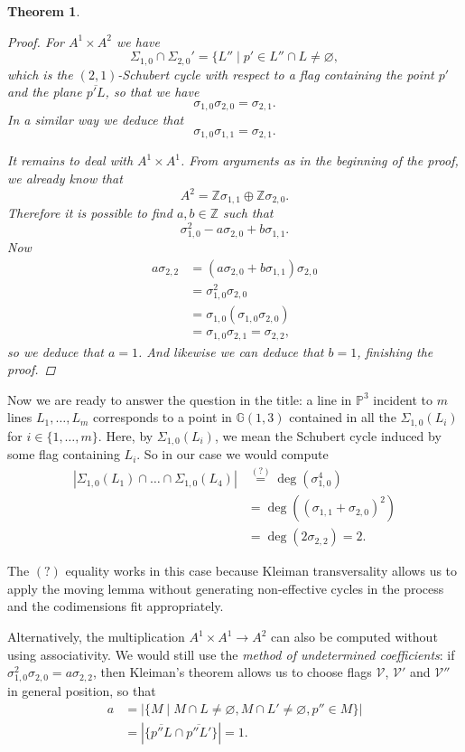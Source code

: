 \documentclass[12pt,a4paper]{amsart}
\theoremstyle{plain}
\newtheorem{thm}{Theorem}[section]
\theoremstyle{definition}
\theoremstyle{remark}
\begin{document}
\begin{thm}
\begin{proof}
	For $A^{1}\times A^{2}$ we have
	\[ \Sigma_{1,0}\cap \Sigma_{2,0}'=\{ L''\mid p'\in L''\cap L\neq \varnothing, \]
	which is the $(2,1)$-Schubert cycle with respect to a flag containing the point $p'$ and the plane $\overline{p'L}$, so that we have
	\[ \sigma_{1,0}\sigma_{2,0}=\sigma_{2,1}. \]
	In a similar way we deduce that
	\[ \sigma_{1,0}\sigma_{1,1}=\sigma_{2,1}. \]

	It remains to deal with $A^{1}\times A^{1}$.
	From arguments as in the beginning of the proof, we already know that
	\[ A^{2}=\mathbb{Z}\sigma_{1,1}\oplus \mathbb{Z}\sigma_{2,0}. \]
	Therefore it is possible to find $a,b\in \mathbb{Z}$ such that
	\[ \sigma_{1,0}^{2}-a\sigma_{2,0}+b\sigma_{1,1}. \]
	Now
	\begin{align*}
	    a\sigma_{2,2} & = (a\sigma_{2,0}+b\sigma_{1,1})\sigma_{2,0} \\
	    & = \sigma_{1,0}^{2}\sigma_{2,0} \\
	    & = \sigma_{1,0}(\sigma_{1,0}\sigma_{2,0}) \\
	    & = \sigma_{1,0}\sigma_{2,1} = \sigma_{2,2},
	\end{align*}
	so we deduce that $a=1$.
	And likewise we can deduce that $b=1$, finishing the proof.
    \end{proof}
\end{thm}

Now we are ready to answer the question in the title: a line in $\mathbb{P}^{3}$ incident to $m$ lines $L_{1},\ldots,L_{m}$ corresponds to a point in $\mathbb{G}(1,3)$ contained in all the $\Sigma_{1,0}(L_{i})$ for $i\in \{1,\ldots,m\}$.
Here, by $\Sigma_{1,0}(L_{i})$, we mean the Schubert cycle induced by some flag containing $L_{i}$.
So in our case we would compute
\begin{align*}
    |\Sigma_{1,0}(L_{1})\cap \ldots\cap \Sigma_{1,0}(L_{4})| & \overset{(?)}{=} \deg(\sigma_{1,0}^{4}) \\
    & = \deg((\sigma_{1,1}+\sigma_{2,0})^{2}) \\
    & =\deg(2\sigma_{2,2})=2.
\end{align*}

The $(?)$ equality works in this case because Kleiman transversality allows us to apply the moving lemma without generating non-effective cycles in the process and the codimensions fit appropriately.

Alternatively, the multiplication $A^{1}\times A^{1}\to A^{2}$ can also be computed without using associativity.
We would still use the \textit{method of undetermined coefficients}: if $\sigma_{1,0}^{2}\sigma_{2,0}=a\sigma_{2,2}$, then Kleiman's theorem allows us to choose flags $\mathcal{V}$, $\mathcal{V}'$ and $\mathcal{V}''$ in general position, so that
\begin{align*}
    a & = |\{ M\mid M\cap L\neq \varnothing,M\cap L'\neq \varnothing,p''\in M \} | \\
    & = | \{ \overline{p''L}\cap \overline{p''L'}\}| = 1.
\end{align*}
\end{document}
